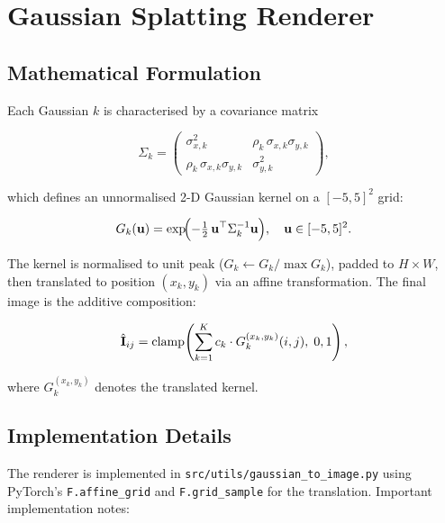 \section{Gaussian Splatting Renderer}
\label{sec:renderer}

\subsection{Mathematical Formulation}

Each Gaussian $k$ is characterised by a covariance matrix

\begin{equation}
  \Sigma_k =
  \begin{pmatrix}
    \sigma_{x,k}^2 & \rho_k\,\sigma_{x,k}\sigma_{y,k} \\
    \rho_k\,\sigma_{x,k}\sigma_{y,k} & \sigma_{y,k}^2
  \end{pmatrix},
  \label{eq:covariance}
\end{equation}

\noindent which defines an unnormalised 2-D Gaussian kernel on a $[-5,5]^2$ grid:

\begin{equation}
  G_k(\mathbf{u}) = \exp\!\Bigl(-\tfrac{1}{2}\,\mathbf{u}^\top \Sigma_k^{-1} \mathbf{u}\Bigr),
  \quad \mathbf{u} \in [-5, 5]^2.
  \label{eq:kernel}
\end{equation}

The kernel is normalised to unit peak ($G_k \leftarrow G_k / \max G_k$),
padded to $H \times W$, then translated to position $(x_k, y_k)$ via an affine
transformation.  The final image is the additive composition:

\begin{equation}
  \hat{\mathbf{I}}_{ij} = \mathrm{clamp}\!\left(
    \sum_{k=1}^{K} c_k \cdot G_k^{(x_k,y_k)}(i,j),\; 0, 1
  \right),
  \label{eq:compositing}
\end{equation}

\noindent where $G_k^{(x_k,y_k)}$ denotes the translated kernel.

\subsection{Implementation Details}

The renderer is implemented in \texttt{src/utils/gaussian\_to\_image.py} using
PyTorch's \texttt{F.affine\_grid} and \texttt{F.grid\_sample} for the translation.
Important implementation notes:

